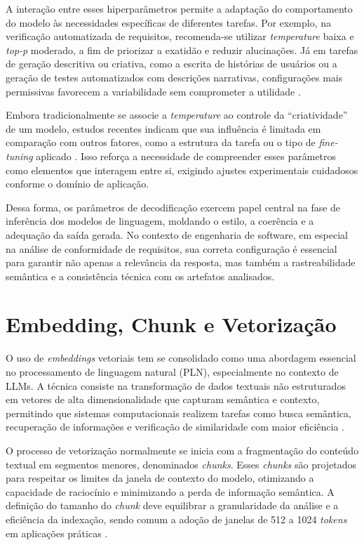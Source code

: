 A interação entre esses hiperparâmetros permite a adaptação do comportamento do modelo às necessidades específicas de diferentes tarefas. Por exemplo, na verificação automatizada de requisitos, recomenda-se utilizar \textit{temperature} baixa e \textit{top-p} moderado, a fim de priorizar a exatidão e reduzir alucinações. Já em tarefas de geração descritiva ou criativa, como a escrita de histórias de usuários ou a geração de testes automatizados com descrições narrativas, configurações mais permissivas favorecem a variabilidade sem comprometer a utilidade .

Embora tradicionalmente se associe a \textit{temperature} ao controle da “criatividade” de um modelo, estudos recentes indicam que sua influência é limitada em comparação com outros fatores, como a estrutura da tarefa ou o tipo de \textit{fine-tuning} aplicado . Isso reforça a necessidade de compreender esses parâmetros como elementos que interagem entre si, exigindo ajustes experimentais cuidadosos conforme o domínio de aplicação.

Dessa forma, os parâmetros de decodificação exercem papel central na fase de inferência dos modelos de linguagem, moldando o estilo, a coerência e a adequação da saída gerada. No contexto de engenharia de software, em especial na análise de conformidade de requisitos, sua correta configuração é essencial para garantir não apenas a relevância da resposta, mas também a rastreabilidade semântica e a consistência técnica com os artefatos analisados.

\section{Embedding, Chunk e Vetorização}

O uso de \textit{embeddings} vetoriais tem se consolidado como uma abordagem essencial no processamento de linguagem natural (PLN), especialmente no contexto de LLMs. A técnica consiste na transformação de dados textuais não estruturados em vetores de alta dimensionalidade que capturam semântica e contexto, permitindo que sistemas computacionais realizem tarefas como busca semântica, recuperação de informações e verificação de similaridade com maior eficiência .

O processo de vetorização normalmente se inicia com a fragmentação do conteúdo textual em segmentos menores, denominados \textit{chunks}. Esses \textit{chunks} são projetados para respeitar os limites da janela de contexto do modelo, otimizando a capacidade de raciocínio e minimizando a perda de informação semântica. A definição do tamanho do \textit{chunk} deve equilibrar a granularidade da análise e a eficiência da indexação, sendo comum a adoção de janelas de 512 a 1024 \textit{tokens} em aplicações práticas .

